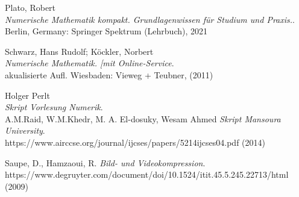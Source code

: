 \documentclass[12pt]{article}
\begin{document}
		\newpage
		\begin{thebibliography}{99} %
			
			Plato, Robert \\
			\emph{Numerische Mathematik kompakt. Grundlagenwissen für Studium und Praxis.}. \\
			Berlin, Germany: Springer Spektrum (Lehrbuch), 2021
			
			Schwarz, Hans Rudolf; Köckler, Norbert  \\
			\emph{ Numerische Mathematik. [mit Online-Service}. \\
			akualisierte Aufl. Wiesbaden: Vieweg + Teubner, (2011)
			
			Holger Perlt \\
			\emph{Skript Vorlesung Numerik}. \\
			
			A.M.Raid, W.M.Khedr, M. A. El-dosuky, Wesam Ahmed
			\emph{Skript Mansoura University}. \\
			https://www.airccse.org/journal/ijcses/papers/5214ijcses04.pdf (2014)
			
			
			Saupe, D., Hamzaoui, R. 
			\emph{Bild- und Videokompression}. \\
			https://www.degruyter.com/document/doi/10.1524/itit.45.5.245.22713/html (2009)
			
		\end{thebibliography}
				\newpage
		
\end{document}
